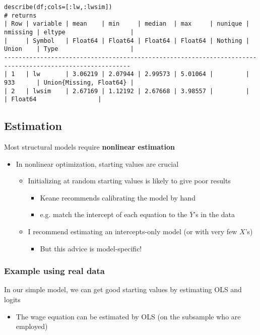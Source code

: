 \documentclass[11pt]{article}
\begin{document}
\begin{verbatim}
describe(df;cols=[:lw,:lwsim])
# returns
| Row | variable | mean    | min     | median  | max     | nunique | nmissing | eltype                  |
|     | Symbol   | Float64 | Float64 | Float64 | Float64 | Nothing | Union    | Type                    |
---------------------------------------------------------------------------------------------------------
| 1   | lw       | 3.06219 | 2.07944 | 2.99573 | 5.01064 |         | 933      | Union{Missing, Float64} |
| 2   | lwsim    | 2.67169 | 1.12192 | 2.67668 | 3.98557 |         |          | Float64                 |
\end{verbatim}

\subsection{Estimation}
\label{sec:org70e8789}


Most structural models require \textbf{nonlinear estimation}

\begin{itemize}
\item In nonlinear optimization, starting values are crucial   
\begin{itemize}
\item Initializing at random starting values is likely to give poor results
\begin{itemize}
\item Keane recommends calibrating the model by hand
\item e.g. match the intercept of each equation to the \(\overline{Y}\)'s in the data
\end{itemize}
\item I recommend estimating an intercepts-only model (or with very few \(X\)'s)
\begin{itemize}
\item But this advice is model-specific!
\end{itemize}
\end{itemize}
\end{itemize}

\subsubsection{Example using real data}
\label{sec:orgcfbf2a3}

In our simple model, we can get good starting values by estimating OLS and logits
\begin{itemize}
\item The wage equation can be estimated by OLS (on the subsample who are employed)
\end{itemize}
\end{document}
